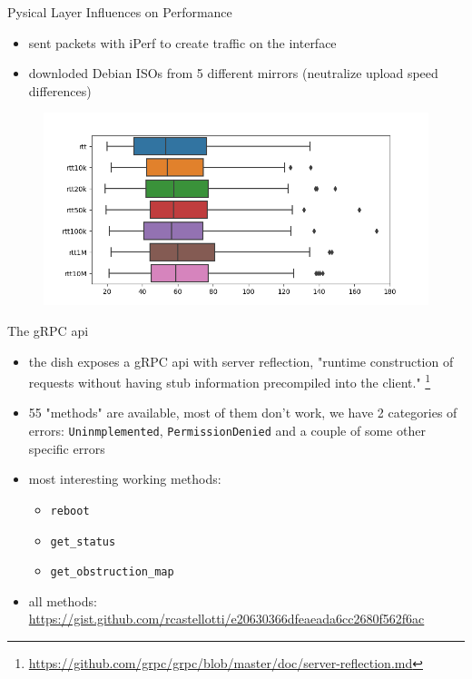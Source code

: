 \documentclass[NET,english,beameralt]{tumbeamer}
\begin{document}
\begin{frame}{Pysical Layer Influences on Performance}
	\begin{itemize}
		\item sent packets with iPerf to create traffic on the interface
		\item downloded Debian ISOs from 5 different mirrors (neutralize upload speed differences)
	\end{itemize}
    \begin{figure}
        \includegraphics[width=1\textwidth]{pics/rtt-iperf-stress.png}
    \end{figure}
\end{frame}

\begin{frame}{The gRPC api}
    \begin{itemize}
		\item the dish exposes a gRPC api with server reflection, "runtime construction of requests without having stub
        information precompiled into the client."
		\footnote{\url{https://github.com/grpc/grpc/blob/master/doc/server-reflection.md}}
        \item 55 "methods" are available, most of them don't work, we have 2 categories of errors: \texttt{Uninmplemented},
        \texttt{PermissionDenied} and a couple of some other specific errors 
        \item most interesting working methods: 
            \begin{itemize}
                \item \texttt{reboot}
                \item \texttt{get\_status}
                \item \texttt{get\_obstruction\_map}
            \end{itemize}
        \item all methods: \url{https://gist.github.com/rcastellotti/e20630366dfeaeada6cc2680f562f6ac}
    \end{itemize}
\end{frame}
\end{document}

